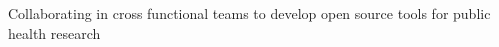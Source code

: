 \begin{cventries}
{\begin{cvitems}
    \item {Collaborating in cross functional teams to develop open source tools
    for public health research
    }
      \end{cvitems}     
    }


\end{cventries}
